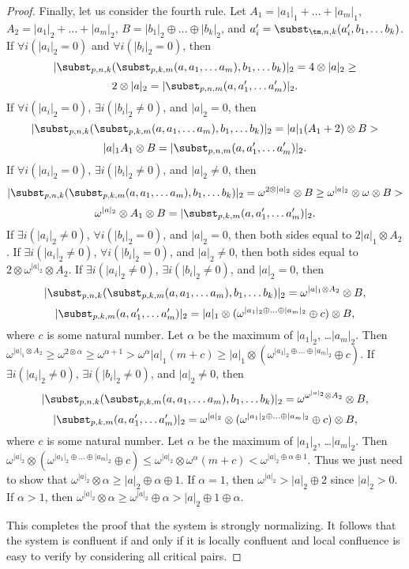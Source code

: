 \begin{proof}
Finally, let us consider the fourth rule.
Let $A_1 = |a_1|_1 + \ldots + |a_m|_1$, $A_2 = |a_1|_2 + \ldots + |a_m|_2$, $B = |b_1|_2 \oplus \ldots \oplus |b_k|_2$, and $a_i' = \subst_{\tm,n,k}(a_i', b_1, \ldots b_k)$.
If $\forall i (|a_i|_2 = 0)$ and $\forall i (|b_i|_2 = 0)$, then
\[ |\subst_{p,n,k}(\subst_{p,k,m}(a, a_1, \ldots a_m), b_1, \ldots b_k)|_2 = 4 \otimes |a|_2 \geq \]
\[ 2 \otimes |a|_2 = |\subst_{p,n,m}(a, a_1', \ldots a_m')|_2. \]
If $\forall i (|a_i|_2 = 0)$, $\exists i (|b_i|_2 \neq 0)$, and $|a|_2 = 0$, then
\[ |\subst_{p,n,k}(\subst_{p,k,m}(a, a_1, \ldots a_m), b_1, \ldots b_k)|_2 = |a|_1 (A_1 + 2) \otimes B > \]
\[ |a|_1 A_1 \otimes B = |\subst_{p,n,m}(a, a_1', \ldots a_m')|_2. \]
If $\forall i (|a_i|_2 = 0)$, $\exists i (|b_i|_2 \neq 0)$, and $|a|_2 \neq 0$, then
\[ |\subst_{p,n,k}(\subst_{p,k,m}(a, a_1, \ldots a_m), b_1, \ldots b_k)|_2 = \omega^{2 \otimes |a|_2} \otimes B \geq \omega^{|a|_2} \otimes \omega \otimes B >  \]
\[ \omega^{|a|_2} \otimes A_1 \otimes B = |\subst_{p,k,m}(a, a_1', \ldots a_m')|_2. \]
If $\exists i (|a_i|_2 \neq 0)$, $\forall i (|b_i|_2 = 0)$, and $|a|_2 = 0$, then both sides equal to $2 |a|_1 \otimes A_2$.
If $\exists i (|a_i|_2 \neq 0)$, $\forall i (|b_i|_2 = 0)$, and $|a|_2 \neq 0$, then both sides equal to $2 \otimes \omega^{|a|_2} \otimes A_2$.
If $\exists i (|a_i|_2 \neq 0)$, $\exists i (|b_i|_2 \neq 0)$, and $|a|_2 = 0$, then
\[ |\subst_{p,n,k}(\subst_{p,k,m}(a, a_1, \ldots a_m), b_1, \ldots b_k)|_2 = \omega^{|a|_1 \otimes A_2} \otimes B, \]
\[ |\subst_{p,k,m}(a, a_1', \ldots a_m')|_2 = |a|_1 \otimes (\omega^{|a_1|_2 \oplus \ldots \oplus |a_m|_2} \oplus c) \otimes B, \]
where $c$ is some natural number.
Let $\alpha$ be the maximum of $|a_1|_2$, \ldots $|a_m|_2$.
Then $\omega^{|a|_1 \otimes A_2} \geq \omega^{2 \otimes \alpha} \geq \omega^{\alpha + 1} > \omega^\alpha |a|_1 (m + c) \geq |a|_1 \otimes (\omega^{|a_1|_2 \oplus \ldots \oplus |a_m|_2} \oplus c)$.
If $\exists i (|a_i|_2 \neq 0)$, $\exists i (|b_i|_2 \neq 0)$, and $|a|_2 \neq 0$, then
\[ |\subst_{p,n,k}(\subst_{p,k,m}(a, a_1, \ldots a_m), b_1, \ldots b_k)|_2 = \omega^{\omega^{|a|_2} \otimes A_2} \otimes B, \]
\[ |\subst_{p,k,m}(a, a_1', \ldots a_m')|_2 = \omega^{|a|_2} \otimes (\omega^{|a_1|_2 \oplus \ldots \oplus |a_m|_2} \oplus c) \otimes B, \]
where $c$ is some natural number.
Let $\alpha$ be the maximum of $|a_1|_2$, \ldots $|a_m|_2$.
Then $\omega^{|a|_2} \otimes (\omega^{|a_1|_2 \oplus \ldots \oplus |a_m|_2} \oplus c) \leq \omega^{|a|_2} \otimes \omega^\alpha (m + c) < \omega^{|a|_2 \oplus \alpha \oplus 1}$.
Thus we just need to show that $\omega^{|a|_2} \otimes \alpha \geq |a|_2 \oplus \alpha \oplus 1$.
If $\alpha = 1$, then $\omega^{|a|_2} > |a|_2 \oplus 2$ since $|a|_2 > 0$.
If $\alpha > 1$, then $\omega^{|a|_2} \otimes \alpha \geq \omega^{|a|_2} \oplus \alpha > |a|_2 \oplus 1 \oplus \alpha$.

This completes the proof that the system is strongly normalizing.
It follows that the system is confluent if and only if it is locally confluent and local confluence is easy to verify by considering all critical pairs.
\end{proof}

